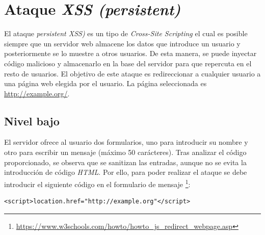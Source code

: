 \documentclass{article}
\begin{document}
\section{Ataque \textit{XSS (persistent)}}
El ataque \textit{persistent XSS)} es un tipo de \textit{Cross-Site Scripting} el cual es posible siempre que un servidor web almacene los datos que introduce un usuario y posteriormente se lo muestre a otros usuarios. De esta manera, se puede inyectar código malicioso y almacenarlo en la base del servidor para que repercuta en el resto de usuarios. El objetivo de este ataque es redireccionar a cualquier usuario a una página web elegida por el usuario. La página seleccionada es \url{http://example.org/}.
\subsection{Nivel bajo}
El servidor ofrece al usuario dos formularios, uno para introducir su nombre y otro para escribir un mensaje (máximo 50 carácteres). Tras analizar el código proporcionado, se observa que se sanitizan las entradas, aunque no se evita la introducción de código \textit{HTML}. Por ello, para poder realizar el ataque se debe introducir el siguiente código en el formulario de mensaje \footnote{\url{https://www.w3schools.com/howto/howto_js_redirect_webpage.asp}}: \\

\begin{lstlisting}
<script>location.href="http://example.org"</script>
\end{lstlisting}
\end{document}
